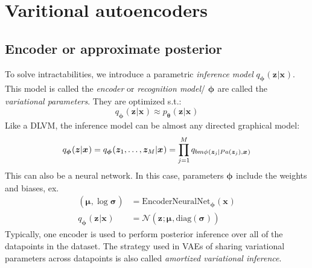 \documentclass{article}
\begin{document}
\section{Varitional autoencoders}
\subsection{Encoder or approximate posterior}
To solve intractabilities, we introduce
a parametric \textit{inference model} $ q_{ \bm{\phi}_{}} (\bm{z}_{}|\bm{x}_{})  $.
This model is called the \textit{encoder} or \textit{recognition model}/
$ \bm{\phi}_{}  $ are called the \textit{variational parameters}.
They are optimized s.t.:
\begin{equation}
		 q_{ \bm{\phi}_{}} (\bm{z}_{}|\bm{x}_{})  \approx
p_{ \bm{\theta}_{} } (\bm{z}_{}|\bm{x}_{})
\end{equation}
Like a DLVM, the inference model can be almost any directed graphical model:
\begin{equation}
		q_{ \bm{\phi}_{}} (\bm{z}_{}|\bm{x}_{}) = 
		q_{ \bm{\phi}_{}} (\bm{z}_{1}, \dots, \bm{z}_{M}|\bm{x}_{}) =
		\prod_{j=1}^{M} q_{ \\bm{\phi}_{} (\bm{z}_{j}| P a (\bm{z}_{j}), \bm{x}_{}) } 
\end{equation}
This can also be a neural network.
In this case, parameters $ \bm{\phi}_{}  $ include the weights and biases, ex.
\begin{align}
		(\bm{\mu}_{}, \log \bm{\sigma}_{}) &= \text{EncoderNeuralNet}_{ \bm{\phi}_{} } (\bm{x}_{})\\
		q_{ \bm{\phi}_{} } (\bm{z}_{}|\bm{x}_{}) &=
		\mathcal{N} (\bm{z}_{}; \bm{\mu}_{}, \text{diag} (\bm{\sigma}_{}))
\end{align}
Typically, one encoder is used to perform posterior inference
over all of the datapoints in the dataset.
The strategy used in VAEs of sharing variational parameters across datapoints is also called
\textit{amortized variational inference}.
\end{document}
